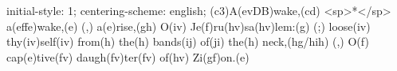 initial-style: 1;
centering-scheme: english;
(c3)A(evDB)wake,(cd) <sp>*</sp> a(effe)wake,(e) (,) a(e)rise,(gh) O(iv) Je(f)ru(hv)sa(hv)lem:(g) (;) loose(iv) thy(iv)self(iv) from(h) the(h) bands(ij) of(ji) the(h) neck,(hg/hih) (,) O(f) cap(e)tive(fv) daugh(fv)ter(fv) of(hv) Zi(gf)on.(e)
